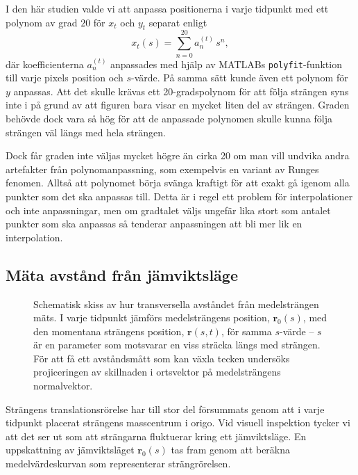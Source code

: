 I den här studien valde vi att anpassa positionerna i varje tidpunkt med ett polynom av grad $20$ för $x_t$ och $y_t$ separat enligt
\begin{equation}\label{eq:anpassning}
x_t(s) = \sum_{n=0}^{20} a_n^{(t)} \,s^n,
\end{equation}
där koefficienterna $a_n^{(t)}$ anpassades med hjälp av MATLABs \texttt{polyfit}-funktion till varje pixels position och $s$-värde. På samma sätt kunde även ett polynom för $y$ anpassas. Att det skulle krävas ett 20-gradspolynom för att följa strängen syns inte i  på grund av att figuren bara visar en mycket liten del av strängen. Graden behövde dock vara så hög för att de anpassade polynomen skulle kunna följa strängen väl längs med hela strängen. 

Dock får graden inte väljas mycket högre än cirka 20 om man vill undvika andra artefakter från polynomanpassning, som exempelvis en variant av Runges fenomen\cite{Gustafsson_LaNa}. Alltså att polynomet börja svänga kraftigt för att exakt gå igenom alla punkter som det ska anpassas till. Detta är i regel ett problem för interpolationer och inte anpassningar, men om gradtalet väljs ungefär lika stort som antalet punkter som ska anpassas så tenderar anpassningen att bli mer lik en interpolation.


\subsection{Mäta avstånd från jämviktsläge}

\begin{figure}
\centering
\resizebox{0.8\textwidth}{!}{
    
}
\caption{Schematisk skiss av hur transversella avståndet från medelsträngen mäts. I varje tidpunkt jämförs medelsträngens position, $\mathbf{r}_0(s)$, med den momentana strängens position, $\mathbf{r}(s, t)$, för samma $s$-värde -- $s$ är en parameter som motsvarar en viss sträcka längs med strängen. För att få ett avståndsmått som kan växla tecken undersöks projiceringen av skillnaden i ortsvektor på medelsträngens normalvektor. 
}
\label{fig:transv_avst}
\end{figure}

Strängens translationsrörelse har till stor del försummats genom att i varje tidpunkt placerat strängens masscentrum i origo. Vid visuell inspektion tycker vi att det ser ut som att strängarna fluktuerar kring ett jämviktsläge. En uppskattning av jämviktsläget $\mathbf{r}_0(s)$ tas fram genom att beräkna medelvärdeskurvan som representerar strängrörelsen. 

